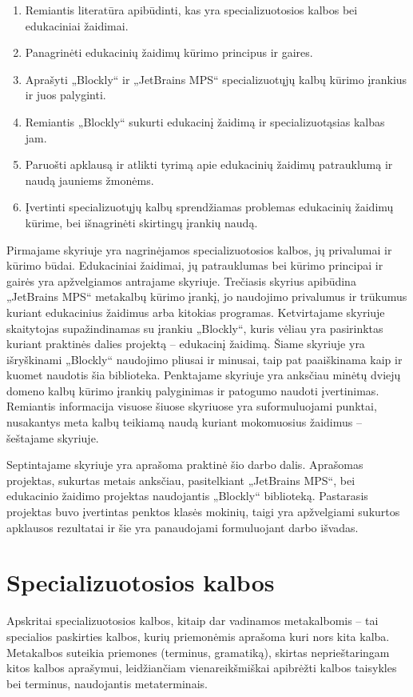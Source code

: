 \documentclass{VUMIFPSkursinis}
\begin{document}
\begin{enumerate}
\item Remiantis literatūra apibūdinti, kas yra specializuotosios kalbos bei edukaciniai žaidimai.
\item Panagrinėti edukacinių žaidimų kūrimo principus ir gaires.
\item Aprašyti „Blockly“ ir „JetBrains MPS“ specializuotųjų kalbų kūrimo įrankius ir juos palyginti.
\item Remiantis „Blockly“ sukurti edukacinį žaidimą ir specializuotąsias kalbas jam. 
\item Paruošti apklausą ir atlikti tyrimą apie edukacinių žaidimų patrauklumą ir naudą jauniems žmonėms.
\item Įvertinti specializuotųjų kalbų sprendžiamas problemas edukacinių žaidimų kūrime, bei išnagrinėti skirtingų įrankių naudą.
\end{enumerate}


Pirmajame skyriuje yra nagrinėjamos specializuotosios kalbos, jų privalumai ir kūrimo būdai. Edukaciniai žaidimai, jų patrauklumas bei kūrimo principai ir gairės yra apžvelgiamos antrajame skyriuje. Trečiasis skyrius apibūdina „JetBrains MPS“ metakalbų kūrimo įrankį, jo naudojimo privalumus ir trūkumus kuriant edukacinius žaidimus arba kitokias programas. Ketvirtajame skyriuje skaitytojas supažindinamas su įrankiu „Blockly“, kuris vėliau yra pasirinktas kuriant praktinės dalies projektą -- edukacinį žaidimą. Šiame skyriuje yra išryškinami „Blockly“ naudojimo pliusai ir minusai, taip pat paaiškinama kaip ir kuomet naudotis šia biblioteka. Penktajame skyriuje yra anksčiau minėtų dviejų domeno kalbų kūrimo įrankių palyginimas ir patogumo naudoti įvertinimas. Remiantis informacija visuose šiuose skyriuose yra suformuluojami punktai, nusakantys meta kalbų teikiamą naudą kuriant mokomuosius žaidimus -- šeštajame skyriuje.

Septintajame skyriuje yra aprašoma praktinė šio darbo dalis. Aprašomas projektas, sukurtas metais anksčiau, pasitelkiant „JetBrains MPS“, bei edukacinio žaidimo projektas naudojantis „Blockly“ biblioteką. Pastarasis projektas buvo įvertintas penktos klasės mokinių, taigi yra apžvelgiami sukurtos apklausos rezultatai ir šie yra panaudojami formuluojant darbo išvadas.

\section{Specializuotosios kalbos}
Apskritai specializuotosios kalbos, kitaip dar vadinamos metakalbomis -- tai specialios paskirties kalbos, kurių priemonėmis aprašoma kuri nors kita kalba. Metakalbos suteikia priemones (terminus, gramatiką), skirtas neprieštaringam kitos kalbos aprašymui, leidžiančiam vienareikšmiškai apibrėžti kalbos taisykles bei terminus, naudojantis metaterminais.
\end{document}
